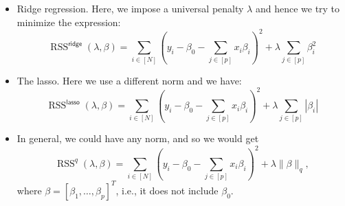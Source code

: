 \documentclass[11pt]{article}
\theoremstyle{definition}
\newcommand{\ridge}{\textsf{ridge}}
\newcommand{\lasso}{\textsf{lasso}}
\DeclareMathOperator*{\RSS}{RSS} \DeclareMathOperator*{\WRSS}{WRSS}
\begin{document}
\begin{itemize}
	\item Ridge regression. Here, we impose a universal penalty $\lambda$ and
	hence we try to minimize the expression:
	\[\RSS^\ridge(\lambda,\beta)=\sum_{i\in[N]}\left(y_i-\beta_0-\sum_{j\in[p]}x_i\beta_i\right)^2
	+ \lambda\sum_{j\in[p]}\beta_i^2\]

	\item The lasso. Here we use a different norm and we have:
	\[\RSS^\lasso(\lambda,\beta)=\sum_{i\in[N]}\left(y_i-\beta_0-\sum_{j\in[p]}x_i\beta_i\right)^2
	+ \lambda\sum_{j\in[p]}|\beta_i|\]

	\item In general, we could have any norm, and so we would get
	\[\RSS^q(\lambda,\beta)=\sum_{i\in[N]}\left(y_i-\beta_0-\sum_{j\in[p]}x_i\beta_i\right)^2
	+ \lambda \|\beta\|_q,\]
	where $\beta=[\beta_1,\ldots,\beta_p]^T$, i.e., it does not include $\beta_0$.
\end{itemize}
\end{document}

